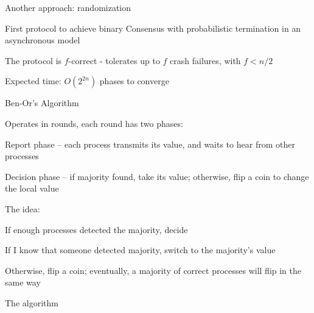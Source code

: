 \begin{frame}{Another approach: randomization}

\BI
\item First protocol to achieve \alert{binary} Consensus with probabilistic termination in an asynchronous model 
\item The protocol is $f$-correct - tolerates up to $f$ crash failures, with $f < n/2$ 
\item Expected time: $O(2^{2n})$ phases to converge
\EI

\bigskip
\begin{Bib}
\BI
\item {}
\EI
\end{Bib}

\end{frame}

\begin{frame}{Ben-Or's Algorithm}

\BIL	
\item Operates in rounds, each round has two phases:
\BI
\item \alert{Report phase} – each process transmits its value, and waits to hear from other processes
\item \alert{Decision phase} – if majority found, take its value; otherwise, flip a coin to change the local value
\EI

\item The idea:
\BI
\item If enough processes detected the majority, decide
\item If I know that someone detected majority, switch to the majority’s value
\item Otherwise, flip a coin; eventually, a majority of correct processes will flip in the same way
\EI

\EIL
\end{frame}


\begin{frame}[shrink]{The algorithm}

\begin{Procedure}	
\caption{Ben-Or's Algorithm executed by process $p_i$}
\BlankLine
{}
\end{Procedure}

\end{frame}

